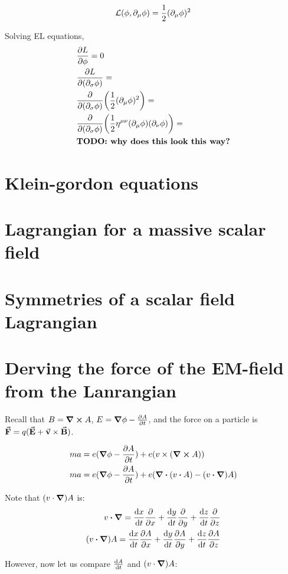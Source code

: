 $$
\mathcal{L}(\phi, \partial_\mu \phi) = \frac{1}{2}(\partial_\mu \phi)^2
$$

Solving EL equations,
\begin{align*}
    &\pdv{L}{\phi} = 0 \\
    &\pdv{L}{(\partial_\sigma \phi)} =   \\
    &\pdv{(\partial_\sigma \phi)} \bigg( \frac{1}{2}(\partial_\mu \phi)^2  \bigg)=  \\
    &\pdv{(\partial_\sigma \phi)}  \bigg( \frac{1}{2}\eta^{\mu \nu} (\partial_\mu \phi) (\partial_\nu \phi) \bigg)=  \\
    &\textbf{TODO: why does this look this way?}
\end{align*}
\section{Klein-gordon equations}
\section{Lagrangian for a massive scalar field}
\section{Symmetries of a scalar field Lagrangian}
\section{Derving the force of the EM-field from the Lanrangian}

Recall that $B = \curl A$, $E = \grad \phi - \pdv{A}{t}$, and the force
on a particle is $\va F = q (\va E + \va v \times \va B)$.

\begin{align*}
ma &= e (\grad \phi - \pdv{A}{t}) + e (v \times (\curl A)) \\
ma &= e (\grad \phi - \pdv{A}{t}) + e (\div (v \vdot A) - (v \vdot \grad) A)
\end{align*}

Note that $(v \cdot \grad) A$ is:
\begin{align*}
v \vdot \grad = \dv{x}{t} \pdv{x} + \dv{y}{t} \pdv{y} + \dv{z}{t} \pdv{z} \\
(v \vdot \grad) A = \dv{x}{t} \pdv{A}{x} + \dv{y}{t} \pdv{A}{y} + \dv{z}{t} \pdv{A}{z} \\
\end{align*}

However, now let us compare $\dv{A}{t}$ and $(v \cdot \grad) A$:

